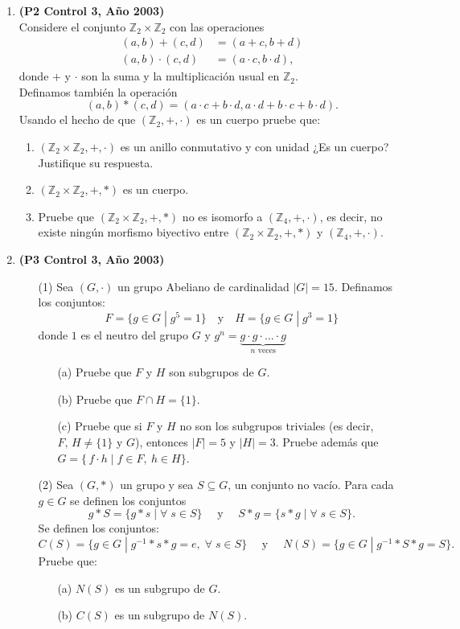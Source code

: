 \documentclass[11pt]{article}
\newcommand{\Z}{\mathbb Z}
\theoremstyle{plain}
\theoremstyle{definition}
\begin{document}
\begin{enumerate}
\item \textbf{(P2 Control 3, Año 2003)}\\
Considere el conjunto $\Z_2\times\Z_2$ con las operaciones
\begin{align*}
(a,b)+(c,d)&=(a+c,b+d)\\
(a,b)\cdot(c,d)&=(a\cdot c,b\cdot d),
\end{align*}
donde $+$ y $\cdot$ son la suma y la multiplicación usual en $\Z_2$.\\
Definamos también la operación
$$(a,b)*(c,d)=(a\cdot c+b\cdot d, a\cdot d+b\cdot c+b\cdot d).$$
Usando el hecho de que $(\Z_2,+,\cdot)$ es un cuerpo pruebe que:
\begin{enumerate}
\item $(\Z_2\times\Z_2, +,\cdot)$ es un anillo conmutativo y con unidad ¿Es un cuerpo? Justifique su respuesta.
\item $(\Z_2\times \Z_2, +,*)$ es un cuerpo.
\item Pruebe que $(\Z_2\times\Z_2,+,*)$ no es isomorfo a $(\Z_4,+,\cdot)$, es decir, no existe ningún morfismo biyectivo entre $(\Z_2\times\Z_2,+,*)$ y $(\Z_4,+,\cdot)$.
\end{enumerate}

\item \textbf{(P3 Control 3, Año 2003)}
\begin{enumerate}
\item[(1)] Sea $(G,\cdot)$ un grupo Abeliano de cardinalidad $|G|=15$. Definamos los conjuntos:
$$F=\{g\in G\;|\;g^5=1\}\quad\mbox{y}\quad H=\{g\in G\;|\;g^3=1\}$$
donde $1$ es el neutro del grupo $G$ y $g^n=\underbrace{g\cdot g\cdot \ldots \cdot g}_{\mbox{$n$ veces}}$
\begin{enumerate}
\item[(a)] Pruebe que $F$ y $H$ son subgrupos de $G$.
\item[(b)] Pruebe que $F\cap H=\{1\}$.
\item[(c)] Pruebe que si $F$ y $H$ no son los subgrupos triviales (es decir, $F,\,H\neq \{1\}$ y $G$), entonces $|F|=5$ y $|H|=3$. Pruebe además que $G=\{\,f\cdot h\;|\;f\in F,\ h\in H\}.$\\
\end{enumerate} 

\item[(2)] Sea $(G,*)$ un grupo y sea $S\subseteq G$, un conjunto no vacío. Para cada $g\in G$ se definen los conjuntos
$$g*S=\{g*s\;|\;\forall\;s\in S\} \quad \mbox{ y } \quad S*g=\{s*g\;|\;\forall\; s\in S\}.$$
Se definen los conjuntos:
$$C(S)=\{g\in G\;|\;g^{-1}*s*g=e,\; \forall\;s\in S\} \quad \mbox{ y } \quad N(S)=\{g\in G\;|\;g^{-1}*S*g=S\}.$$
Pruebe que:
\begin{enumerate}
\item[(a)] $N(S)$ es un subgrupo de $G$.
\item[(b)] $C(S)$ es un subgrupo de $N(S)$.
\end{enumerate}
\end{enumerate}


\end{enumerate}
\end{document}
